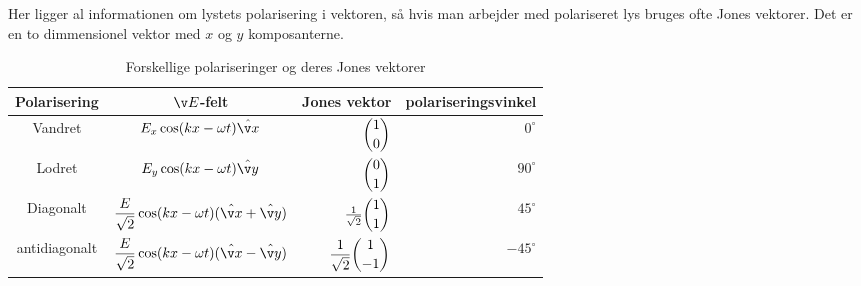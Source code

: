 Her ligger al informationen om lystets polarisering i vektoren, så hvis man arbejder med polariseret lys bruges ofte Jones vektorer. Det er en to dimmensionel vektor med $x$ og $y$ komposanterne.
\begin{table}[h]
\center
\begin{tabular}{c|c r r}
Polarisering &$\v E$-felt & Jones vektor & polariseringsvinkel\\\hline
Vandret & $E_x\cos(kx-\omega t)\hat{\v x}$ & $\dbinom{1}{0}$&$0^\circ$\\
Lodret & $E_y\cos(kx-\omega t)\hat{\v y}$ & $\dbinom{0}{1}$&$90^\circ$\\
Diagonalt & $\dfrac{E}{\sqrt{2}}\cos(kx-\omega t)(\hat{\v x}+\hat{\v y})$ & $\frac{1}{\sqrt{2}}\dbinom{1}{1}$&$45^\circ$\\
antidiagonalt & $\dfrac{E}{\sqrt{2}}\cos(kx-\omega t)(\hat{\v x}-\hat{\v y})$ & $\dfrac{1}{\sqrt{2}}\dbinom{1}{-1}$&$-45^\circ$\\
\end{tabular}
\caption{Forskellige polariseringer og deres Jones vektorer}
\end{table}